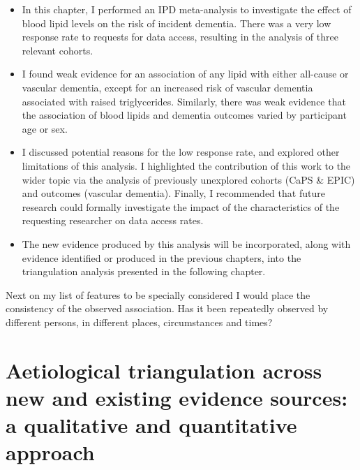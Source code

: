 \documentclass[a4paper, twoside]{templates/ociamthesis}
\begin{document}
\begin{itemize}
\item
  In this chapter, I performed an IPD meta-analysis to investigate the effect of blood lipid levels on the risk of incident dementia. There was a very low response rate to requests for data access, resulting in the analysis of three relevant cohorts.
\item
  I found weak evidence for an association of any lipid with either all-cause or vascular dementia, except for an increased risk of vascular dementia associated with raised triglycerides. Similarly, there was weak evidence that the association of blood lipids and dementia outcomes varied by participant age or sex.
\item
  I discussed potential reasons for the low response rate, and explored other limitations of this analysis. I highlighted the contribution of this work to the wider topic via the analysis of previously unexplored cohorts (CaPS \& EPIC) and outcomes (vascular dementia). Finally, I recommended that future research could formally investigate the impact of the characteristics of the requesting researcher on data access rates.
\item
  The new evidence produced by this analysis will be incorporated, along with evidence identified or produced in the previous chapters, into the triangulation analysis presented in the following chapter.
\end{itemize}

\begin{savequote}
Next on my list of features to be specially considered I would place the
consistency of the observed association. Has it been repeatedly observed
by different persons, in different places, circumstances and times?
\end{savequote}



\hypertarget{tri-heading}{%
\chapter{Aetiological triangulation across new and existing evidence sources: a qualitative and quantitative approach}\label{tri-heading}}

~

\minitoc 

\newpage
\end{document}
